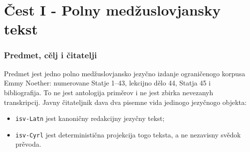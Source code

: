 \documentclass[11pt]{article}
\newcommand{\code}[1]{\texttt{#1}}
\begin{document}
\begin{abstract}
\medskip
\noindent\textbf{English.}
This paper documents the production of a complete Interslavic edition of Emmy Noether's mathematical works in editorial Latin script and deterministically derived Cyrillic. The purpose is practical reading by speakers of Slavic languages, including readers without English, rather than a display of linguistic experimentation. Release v021 makes 4,053 exactly localized corrections to the Latin canon through 12 append-only decisions. The first 656 sites repair morphology, terminology, and lexical consistency; 1,599 sites normalize optional consonants \code{ć/đ} to the basic surface \code{č/dž}; and 1,798 sites normalize six other optional letters while preserving four foreign \code{è} spellings. The frozen result has zero non-Roman lexical projection blockers. Projector v8 authenticates that freeze, a rebased 5,290-record manifest, 372 inherited effects, and 722 Roman-identity loci. An independent derivation reproduces the four Cyrillic files byte for byte; 2,049 changed input blocks license every output delta, while 2,053 unchanged controls remain identical. The complete readers contain 565 and 588 pages; release QA reports 38 passing checks and zero errors. ``Zero blockers'' denotes only the completed declared audit frontier, not native-speaker, community, or scholarly certification. Sources, decisions, software, hashes, limitations, and public access points are retained so another session or reviewer can reproduce, challenge, or monotonically extend the edition.
\end{abstract}

\part*{Čest I - Polny medžuslovjansky tekst}

\section{Predmet, cělj i čitatelji}

Predmet jest jedno polno medžuslovjansko jezyčno izdanje ograničenogo korpusa Emmy Noether: numerovane Statje 1--43, lekcijno dělo 44, Statja 45 i bibliografija. To ne jest antologija priměrov i ne jest zbirka nevezanyh transkripcij. Javny čitateljnik dava dva pisemne vida jedinogo jezyčnogo objekta:

\begin{itemize}
\item \code{isv-Latn} jest kanoničny redakcijny jezyčny tekst;
\item \code{isv-Cyrl} jest deterministična projekcija togo teksta, a ne nezavisny svědok prěvoda.
\end{itemize}
\end{document}
